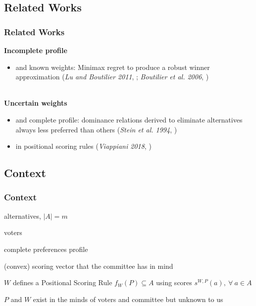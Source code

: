 \documentclass{beamer}
\newcommand{\w}{\bm{w}}
\begin{document}
\subsection{Related Works}
\begin{frame}
	\frametitle{Related Works}
	\textbf{Incomplete profile}  
	\begin{itemize}
		\item and known weights: Minimax regret to produce a robust winner approximation (\textit{Lu and Boutilier 2011}, \cite{Lu2011}; \textit{Boutilier et al. 2006}, \cite{Boutilier2006})
	\end{itemize}~\\
	\textbf{Uncertain weights} 
	\begin{itemize}
		\item and complete profile: dominance relations derived to eliminate alternatives always less preferred than others (\textit{Stein et al. 1994}, \cite{Stein1994})
		\item in positional scoring rules (\textit{Viappiani 2018}, \cite{Viappiani2018})
	\end{itemize}
\end{frame}

\subsection{Context}

\begin{frame}
	\frametitle{Context}

		\begin{description}[$W=(\w_k,\ 1\leq k \leq m), \ W \in \mathcal{W}$]
			\item [$A$] alternatives, $|A|=m$
			\item [$N$] voters 
			\item [$P = (\pref_j, \ j \in N ), \ P \in \mathcal{P} $] complete preferences profile 
			\item [$W=(\w_r,\ 1\leq r \leq m), \ W \in \mathcal{W}$] (convex) scoring vector that the committee has in mind
		\end{description}
		\bigskip
		 \begin{block}{}
			$W$ defines a Positional Scoring Rule $f_W(P)\subseteq A$ using scores \color{blue}$s^{W,P}(a), \ \forall \ a \in A$
		\end{block}
		 \begin{block}{}
			$P$ and $W$ exist in the minds of voters and committee but unknown to us
		\end{block}
		
\end{frame}
\end{document}
